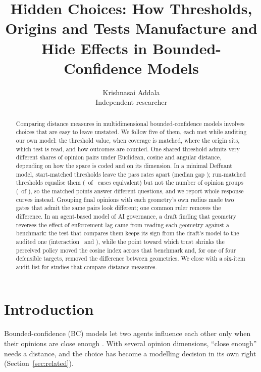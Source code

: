 \documentclass[11pt]{article}
\title{Hidden Choices: How Thresholds, Origins and Tests Manufacture and Hide Effects in Bounded-Confidence Models}
\author{Krishnasai Addala\\ \small Independent researcher}
\date{}
\begin{document}
\maketitle

\begin{abstract}
Comparing distance measures in multidimensional bounded-confidence models involves choices that are easy to leave unstated.
We follow five of them, each met while auditing our own model: the threshold value, when coverage is matched, where the origin sits, which test is read, and how outcomes are counted.
One shared threshold admits very different shares of opinion pairs under Euclidean, cosine and angular distance, depending on how the space is coded and on its dimension.
In a minimal Deffuant model, start-matched thresholds leave the pass rates apart (median gap \VTzeroPassGap); run-matched thresholds equalise them (\VRunPassEquiv\ of \VCases\ cases equivalent) but not the number of opinion groups (\VRunGroupEquiv\ of \VCases), so the matched points answer different questions, and we report whole response curves instead.
Grouping final opinions with each geometry's own radius made two gates that admit the same pairs look different; one common ruler removes the difference.
In an agent-based model of AI governance, a draft finding that geometry reverses the effect of enforcement lag came from reading each geometry against a benchmark: the test that compares them keeps its sign from the draft's model to the audited one (interaction \VCDraftInter\ and \VCRecommendedInter), while the point toward which trust shrinks the perceived policy moved the cosine index across that benchmark and, for one of four defensible targets, removed the difference between geometries.
We close with a six-item audit list for studies that compare distance measures.
\end{abstract}

\section{Introduction}

Bounded-confidence (BC) models let two agents influence each other only when their opinions are close enough \citep{deffuant2000,hegselmann2002}.
With several opinion dimensions, ``close enough'' needs a distance, and the choice has become a modelling decision in its own right (Section~\ref{sec:related}).
\end{document}
